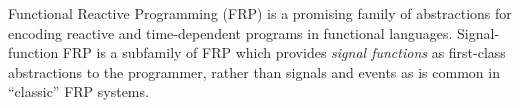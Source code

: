 Functional Reactive Programming (FRP) is a promising family of abstractions for
encoding reactive and time-dependent programs in functional languages.
Signal-function FRP is a subfamily of FRP which provides {\em signal functions}
as first-class abstractions to the programmer, rather than signals and events as
is common in ``classic'' FRP systems.